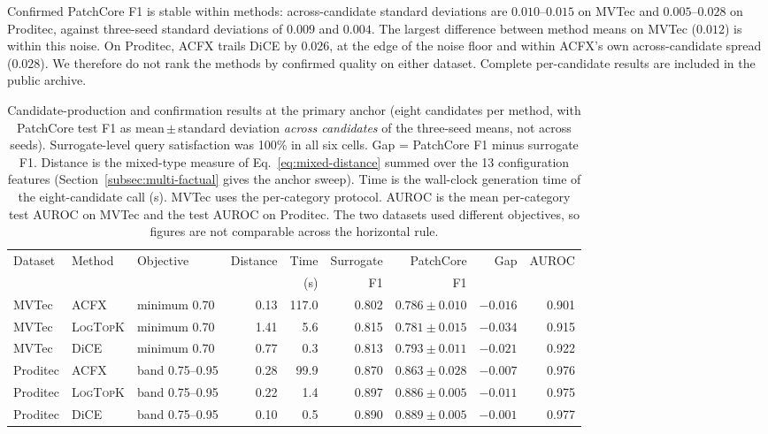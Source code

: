 \documentclass[final,5p,times,twocolumn]{elsarticle}
\begin{document}
Confirmed PatchCore F1 is stable within methods: across-candidate
standard deviations are $0.010$--$0.015$ on MVTec and $0.005$--$0.028$
on Proditec, against three-seed standard deviations of $0.009$ and
$0.004$. The largest difference between method means on MVTec ($0.012$) is within this noise. On Proditec, ACFX trails DiCE by $0.026$, at the edge of the noise floor and within ACFX's own across-candidate spread ($0.028$). We therefore do not rank the methods by confirmed quality on either dataset. Complete per-candidate results are included in the
public archive.

\begin{table}[!tb] \centering \footnotesize \caption{Candidate-production and confirmation results at the primary
anchor (eight candidates per method, with PatchCore test F1 as mean\,$\pm$\,standard deviation \emph{across candidates} of the three-seed means, not across seeds). Surrogate-level query satisfaction
was 100\% in all six cells. Gap = PatchCore F1 minus surrogate F1.
Distance is the mixed-type measure of Eq.~\ref{eq:mixed-distance}
summed over the 13 configuration features
(Section~\ref{subsec:multi-factual} gives the anchor sweep). Time is the wall-clock generation time of the eight-candidate call (s). MVTec uses the per-category protocol. AUROC is the mean per-category test AUROC on MVTec and the test AUROC on Proditec. The two datasets used different objectives, so figures are not comparable across the horizontal rule.}
\label{tab:technical-evaluation-summary}
\setlength{\tabcolsep}{4.5pt}
\begin{tabular}{@{}lllrrrrrr@{}}
\toprule
Dataset & Method & Objective & Distance & Time & Surrogate &
PatchCore & Gap & AUROC \\
        &        &           &          & (s)  & F1        &
F1        &     &       \\
\midrule
MVTec    & ACFX             & minimum 0.70 & 0.13 & 117.0 & 0.802 & $0.786 \pm 0.010$ & $-0.016$ & 0.901 \\
MVTec    & \textsc{LogTopK} & minimum 0.70 & 1.41 &   5.6 & 0.815 & $0.781 \pm 0.015$ & $-0.034$ & 0.915 \\
MVTec    & DiCE             & minimum 0.70 & 0.77 &   0.3 & 0.813 & $0.793 \pm 0.011$ & $-0.021$ & 0.922 \\
\midrule
Proditec & ACFX             & band 0.75--0.95 & 0.28 & 99.9 & 0.870 & $0.863 \pm 0.028$ & $-0.007$ & 0.976 \\
Proditec & \textsc{LogTopK} & band 0.75--0.95 & 0.22 &  1.4 & 0.897 & $0.886 \pm 0.005$ & $-0.011$ & 0.975 \\
Proditec & DiCE             & band 0.75--0.95 & 0.10 &  0.5 & 0.890 & $0.889 \pm 0.005$ & $-0.001$ & 0.977 \\
\bottomrule
\end{tabular}
\end{table}
\end{document}
